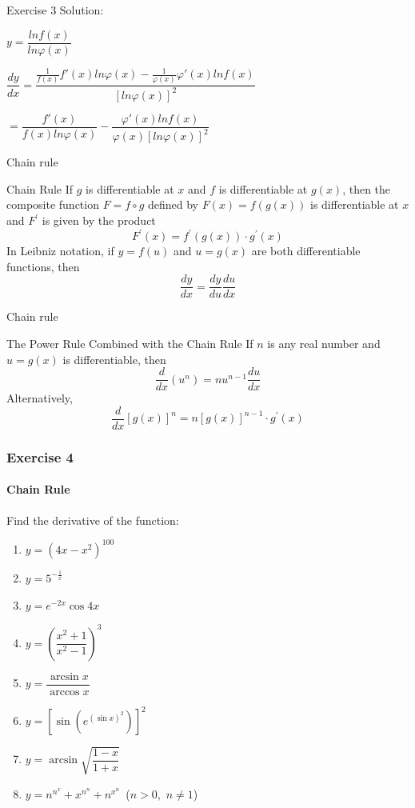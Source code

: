 \begin{frame}{Exercise 3}
    Solution:

    $y = \dfrac{lnf(x)}{ln\varphi(x)}$

    $\dfrac{dy}{dx} = \dfrac{\frac{1}{f(x)}f'(x)ln\varphi(x) - \frac{1}{\varphi(x)}\varphi'(x)lnf(x)}{[ln\varphi(x)]^2}$

    $=\dfrac{f'(x)}{f(x)ln\varphi(x)} - \dfrac{\varphi'(x)lnf(x)}{\varphi(x)[ln\varphi(x)]^2}$

\end{frame}




\begin{frame}{Chain rule}
    \begin{block}{Chain Rule}
        If $g$ is differentiable at $x$ and $f$ is differentiable at $g(x)$, then the composite function $F=f \circ g$ defined by $F(x)=f(g(x))$ is differentiable at $x$ and $F^{\prime}$ is given by the product
        $$
            F^{\prime}(x)=f^{\prime}(g(x)) \cdot g^{\prime}(x)
        $$
        In Leibniz notation, if $y=f(u)$ and $u=g(x)$ are both differentiable functions, then
        $$
            \frac{d y}{d x}=\frac{d y}{d u} \frac{d u}{d x}
        $$
    \end{block}
\end{frame}



\begin{frame}{Chain rule}
    \begin{block}{The Power Rule Combined with the Chain Rule }
        If $n$ is any real number and $u=g(x)$ is differentiable, then
        $$
            \frac{d}{d x}\left(u^{n}\right)=n u^{n-1} \frac{d u}{d x}
        $$
        Alternatively,
        $$
            \frac{d}{d x}[g(x)]^{n}=n[g(x)]^{n-1} \cdot g^{\prime}(x)
        $$
    \end{block}
\end{frame}


\begin{frame}
    \frametitle{Exercise 4}
    \framesubtitle{Chain Rule}
    Find the derivative of the function:
    \begin{enumerate}
        \item $y = (4x - x^{2})^{100}$
        \item $y = 5^{-\frac{1}{x}}$
        \item $y = e^{-2x}\cos{4x}$
        \item $y = (\dfrac{x^{2}+1}{x^{2}-1})^{3}$
        \item $y = \dfrac{\arcsin{x}}{\arccos{x}}$
        \item $y = [\sin{(e^{(\sin{x})^{2}})}]^{2}$
        \item $y = \arcsin{\sqrt{\dfrac{1 - x}{1 + x}}}$
        \item $y = n^{n^{x}} + x^{n^{n}} + n^{x^{n}}$\ ($n > 0$,\ $n \neq 1$)
    \end{enumerate}
\end{frame}



